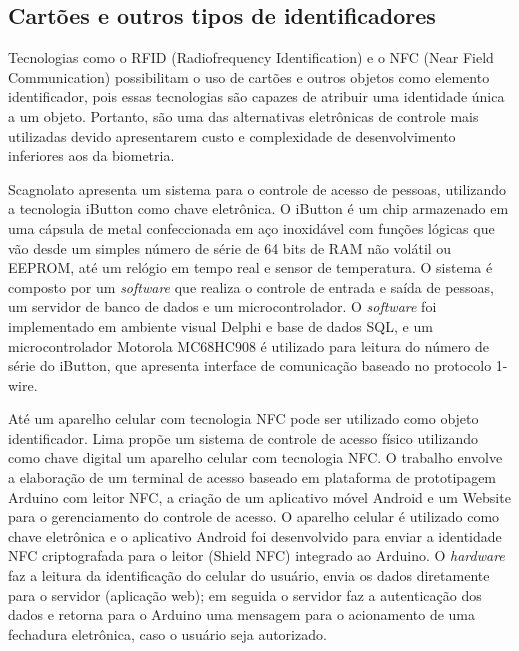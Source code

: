  
 
 \subsection{Cartões e outros tipos de identificadores}

 Tecnologias como o RFID (Radiofrequency Identification) e o NFC (Near Field Communication) possibilitam o uso de cartões e outros objetos como elemento identificador, pois essas tecnologias são capazes de atribuir uma identidade única a um objeto. Portanto, são uma das alternativas eletrônicas de controle mais utilizadas devido apresentarem custo e complexidade de desenvolvimento inferiores aos da biometria.
 
 
 
 Scagnolato \cite{scagnolato2005vital} apresenta um sistema para o controle de acesso de pessoas, utilizando a tecnologia iButton como chave eletrônica. O iButton é um chip armazenado em uma cápsula de metal confeccionada em aço inoxidável com funções lógicas que vão desde um simples número de série de 64 bits de RAM não volátil ou EEPROM, até um relógio em tempo real e sensor de temperatura. O sistema é composto por um \textit{software} que realiza o controle de entrada e saída de pessoas, um servidor de banco de dados e um microcontrolador. O \textit{software} foi implementado em ambiente visual Delphi e base de dados SQL, e um microcontrolador Motorola MC68HC908 é utilizado para leitura do número de série do iButton, que apresenta interface de comunicação baseado no protocolo 1-wire.
 

 Até um aparelho celular com tecnologia NFC pode ser utilizado como objeto identificador. Lima \cite{lima2013proposta} propõe um sistema de controle de acesso físico utilizando como chave digital um aparelho celular com tecnologia NFC. O trabalho envolve a elaboração de um terminal de acesso baseado em plataforma de prototipagem Arduino com leitor NFC, a criação de um aplicativo móvel Android e um Website para o gerenciamento do controle de acesso. O aparelho celular é utilizado como chave eletrônica e o aplicativo Android foi desenvolvido para enviar a identidade NFC criptografada para o leitor (Shield NFC) integrado ao Arduino.  O \textit{hardware} faz a leitura da identificação do celular do usuário, envia os dados diretamente para o servidor (aplicação web); em seguida o servidor faz a autenticação dos dados e retorna para o Arduino uma mensagem para o acionamento de uma fechadura eletrônica, caso o usuário seja autorizado.
 
